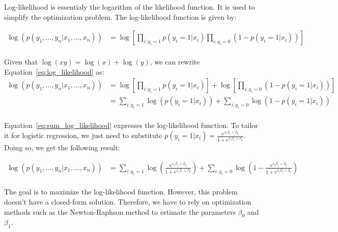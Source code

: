 \documentclass{article}
\begin{document}
Log-likelihood is essentialy the logarithm of the likelihood function. It is used to simplify the optimization problem. The log-likelihood function is given by:

\begin{equation}
  \begin{aligned}
    \log(p(y_1, \hdots, y_n | x_1, \hdots, x_n)) &= \log\left[\prod_{i:y_i = 1}^{} p(y_i = 1 | x_i)\prod_{i:y_i = 0}^{} (1 - p(y_i = 1 | x_i))\right] \\
  \end{aligned}
  \label{eq:log_likelihood}
\end{equation}

Given that $\log(xy) = \log(x) + \log(y)$, we can rewrite Equation~\ref{eq:log_likelihood} as:
\begin{equation}
  \begin{aligned}
    \log(p(y_1, \hdots, y_n | x_1, \hdots, x_n)) &= \log\left[\prod_{i:y_i = 1}^{} p(y_i = 1 | x_i)\right] + \log\left[\prod_{i:y_i = 0}^{} (1 - p(y_i = 1 | x_i))\right] \\
    &= \sum_{i:y_i = 1}^{}\log(p(y_i = 1 | x_i)) + \sum_{i:y_i = 0}^{}\log(1 - p(y_i = 1 | x_i)) \\
  \end{aligned}
  \label{eq:sum_log_likelihood}
\end{equation}

Equation~\ref{eq:sum_log_likelihood} expresses the log-likelihood function. To tailor it for logistic regression, we just need to substitute $p(y_i = 1 | x_i) = \frac{e^{x_i\beta_1 + \beta_0}}{1 + e^{x_i\beta_1 + \beta_0}}$. Doing so, we get the following result:

\begin{equation}
  \begin{aligned}
    \log(p(y_1, \hdots, y_n | x_1, \hdots, x_n)) &= \sum_{i:y_i = 1}^{}\log(\frac{e^{x_i\beta_1 + \beta_0}}{1 + e^{x_i\beta_1 + \beta_0}}) + \sum_{i:y_i = 0}^{}\log(1 - \frac{e^{x_i\beta_1 + \beta_0}}{1 + e^{x_i\beta_1 + \beta_0}}) \\
  \end{aligned}
  \label{eq:final_sum_log_likelihood}
\end{equation}

The goal is to maximize the log-likelihood function. However, this problem doesn't have a closed-form solution. Therefore, we have to rely on optimization methods such as the Newton-Raphson method to estimate the parameters $\beta_0$ and $\beta_1$.
\end{document}
